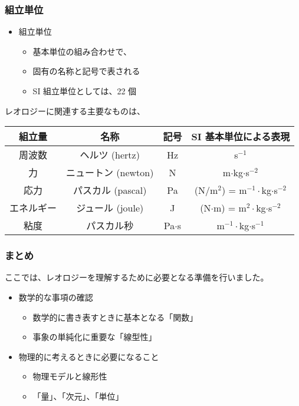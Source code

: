 \documentclass[12pt, dvipdfmx]{beamer}
\begin{document}
\begin{frame}
	\frametitle{組立単位}
	\begin{itemize}
		\item 組立単位
		\begin{itemize}
			\item 基本単位の組み合わせで、
			\item 固有の名称と記号で表される
			\item SI 組立単位としては、22 個
		\end{itemize}
	\end{itemize}
	レオロジーに関連する主要なものは、
	\vspace{-3mm}
	\small
	\begin{center}
		\begin{tabular}{|c|c||c|c|} \hline
			組立量 		& 名称					& 記号		& SI 基本単位による表現 	\\ \hline \hline
			周波数		& ヘルツ (hertz)		& Hz		&  s$^{-1}$ 					\\ \hline
			力			& ニュートン (newton)	& N 		& m$\cdot$kg$\cdot$s$^{-2}$ 	\\ \hline
			応力		& パスカル (pascal)		& Pa 		& (N/m$^2$) = m$^{-1}\cdot$kg$\cdot$s$^{-2}$ \\ \hline
			エネルギー	& ジュール (joule)		& J 		& (N$\cdot$m) = m$^{2}\cdot$kg$\cdot$s$^{-2}$ \\ \hline
			粘度		& パスカル秒			& Pa$\cdot$s & m$^{-1}\cdot$kg$\cdot$s$^{-1}$ \\ \hline
		\end{tabular}
	\end{center}
\end{frame}

\begin{frame}
	\frametitle{まとめ}
	ここでは、レオロジーを理解するために必要となる準備を行いました。
	\begin{boxnote}
		\begin{itemize}
			\item 数学的な事項の確認
			\begin{itemize}
				\item 数学的に書き表すときに基本となる「関数」
				\item 事象の単純化に重要な「線型性」
			\end{itemize}
			\item 物理的に考えるときに必要になること
			\begin{itemize}
				\item 物理モデルと線形性
				\item 「量」、「次元」、「単位」
			\end{itemize}
		\end{itemize} 
	\end{boxnote}
\end{frame}
\end{document}
